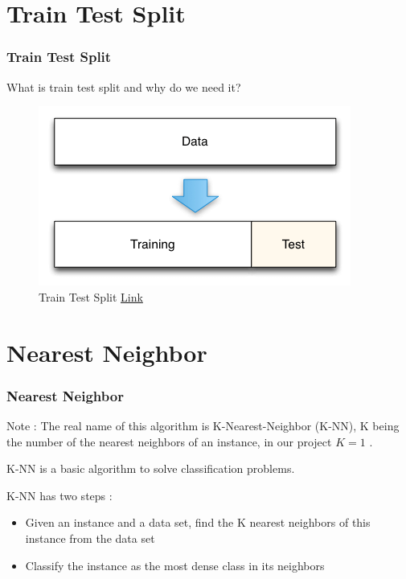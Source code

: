 \documentclass{beamer}
\begin{document}
\section{Train Test Split}

\begin{frame}
\frametitle{Train Test Split}
What is train test split and why do we need it?
\begin{figure}
\centering
\includegraphics[scale=0.4]{Train-Test-Data-Split.png}
\caption{Train Test Split \textcolor{blue}{\href{https://www.researchgate.net/figure/Train-Test-Data-Split_fig6_325870973}{Link}}}
\end{figure}
\end{frame}

\section{Nearest Neighbor}

\begin{frame}
\frametitle{Nearest Neighbor}
\begin{alertblock}{Note :}
The real name of this algorithm is K-Nearest-Neighbor (K-NN), K being the number of the nearest neighbors of an instance, in our project $ K = 1 $ .
\end{alertblock}
K-NN is a basic algorithm to solve classification problems.
\begin{block}{K-NN has two steps :}
\begin{itemize}
\item Given an instance and a data set, find the K nearest neighbors of this instance from the data set
\item Classify the instance as the most dense class in its neighbors
\end{itemize}
\end{block}
\end{frame}
\end{document}
